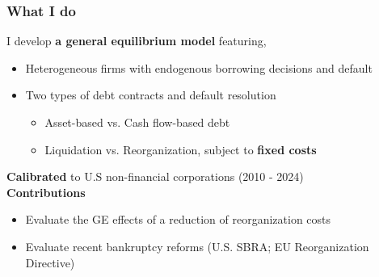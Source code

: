 \documentclass[aspectratio=169,xcolor=table]{beamer}
\begin{document}
\begin{frame}[label=What I do] \frametitle{What I do}

I develop \textbf{a general equilibrium model} featuring,
\begin{itemize} 
    \item Heterogeneous firms with endogenous borrowing decisions and default
    \item Two types of debt contracts and default resolution  \vspace{1mm}
\begin{itemize} \small
    \item Asset-based vs. Cash flow-based debt 
    \item Liquidation vs. Reorganization, subject to \textbf{fixed costs}  
\end{itemize}
\end{itemize} \normalsize  \vspace{3mm}

\textbf {Calibrated} to U.S non-financial corporations (2010 - 2024)  \vspace{3mm} \\
\textbf{Contributions}
\begin{itemize} \small
    \item[1.] Evaluate the GE effects of a reduction of reorganization costs
   \item[2.] Evaluate recent bankruptcy reforms (U.S. SBRA; EU Reorganization Directive)
\end{itemize}

\end{frame} 
\end{document}
